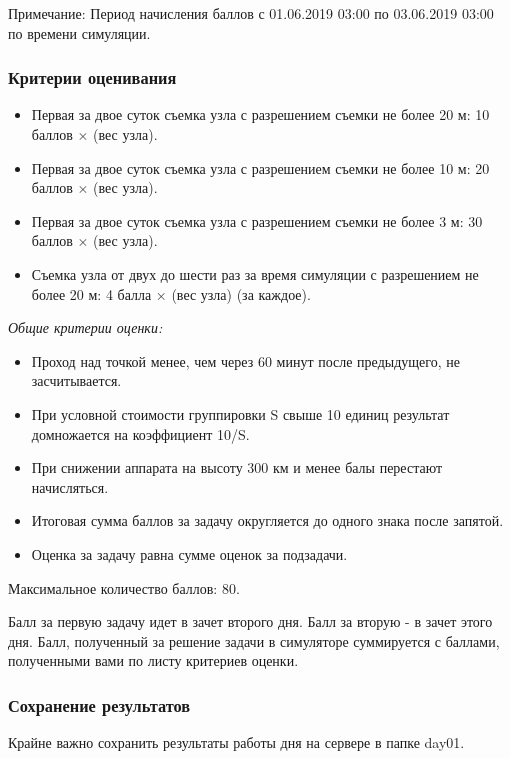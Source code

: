Примечание: Период начисления баллов с 01.06.2019 03:00 по 03.06.2019 03:00 по времени симуляции.

\subsubsection*{Критерии оценивания}

\begin{itemize}
    \item Первая за двое суток съемка узла с разрешением съемки не более 20 м: 10 баллов $\times$ (вес узла).
    \item Первая за двое суток съемка узла с разрешением съемки не более 10 м: 20 баллов $\times$ (вес узла).
    \item Первая за двое суток съемка узла с разрешением съемки не более 3 м: 30 баллов $\times$ (вес узла).
    \item Съемка узла от двух до шести раз за время симуляции с разрешением не более 20 м: 4 балла $\times$ (вес узла) (за каждое).
\end{itemize}

\textit{Общие критерии оценки:}

\begin{itemize}
    \item Проход над точкой менее, чем через 60 минут после предыдущего, не засчитывается.
    \item При условной стоимости группировки S свыше 10 единиц результат домножается на коэффициент 10/S.
    \item При снижении аппарата на высоту 300 км и менее балы перестают начисляться.
    \item Итоговая сумма баллов за задачу округляется до одного знака после запятой.
    \item Оценка за задачу равна сумме оценок за подзадачи.
\end{itemize}

Максимальное количество баллов: 80.

Балл за первую задачу идет в зачет второго дня. Балл за вторую - в зачет этого дня. Балл, полученный за решение задачи в симуляторе суммируется с баллами, полученными вами по листу критериев оценки.

\subsubsection*{Сохранение результатов}

Крайне важно сохранить результаты работы дня на сервере в папке day01.

